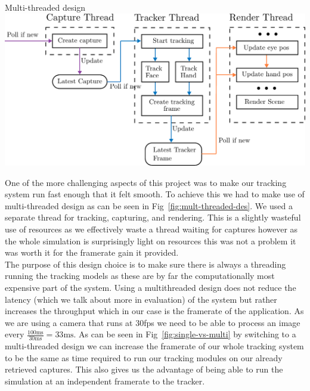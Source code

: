 \begin{figureBox}[label={fig:mult-threaded-des}, width=0.8\linewidth]{Multi-threaded design}
    \includegraphics[width = 0.8\linewidth]{./implementation/figures/multi-thread-design.pdf}
\end{figureBox}

One of the more challenging aspects of this project was to make our tracking system run fast enough that it felt smooth. To achieve this we had to make use of multi-threaded design as can be seen in Fig~\ref{fig:mult-threaded-des}. We used a separate thread for tracking, capturing, and rendering. This is a slightly wasteful use of resources as we effectively waste a thread waiting for captures however as the whole simulation is surprisingly light on resources this was not a problem it was worth it for the framerate gain it provided. \\

The purpose of this design choice is to make sure there is always a threading running the tracking models as these are by far the computationally most expensive part of the system. Using a multithreaded design does not reduce the latency (which we talk about more in evaluation) of the system but rather increases the throughput which in our case is the framerate of the application. As we are using a camera that runs at 30fps we need to be able to process an image every $\frac{100\text{ms}}{30\text{ms}} = 33 \text{ms} $. As can be seen in Fig~\ref{fig:single-vs-multi} by switching to a multi-threaded design we can increase the framerate of our whole tracking system to be the same as time required to run our tracking modules on our already retrieved captures. This also gives us the advantage of being able to run the simulation at an independent framerate to the tracker. \\

